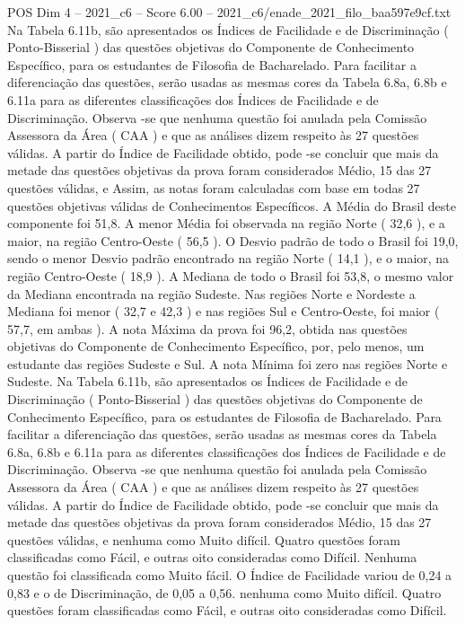 \begin{textsample}{POS Dim 4 – 2021\_c6 – Score 6.00 – 2021\_c6/enade\_2021\_filo\_baa597e9cf.txt}
Na Tabela 6.11b, são apresentados os Índices de Facilidade e de Discriminação ( Ponto-Bisserial ) das questões objetivas do Componente de Conhecimento Específico, para os estudantes de Filosofia de Bacharelado.
Para facilitar a diferenciação das questões, serão usadas as mesmas cores da Tabela 6.8a, 6.8b e 6.11a para as diferentes classificações dos Índices de Facilidade e de Discriminação.
Observa -se que nenhuma questão foi anulada pela Comissão Assessora da Área ( CAA ) e que as análises dizem respeito às 27 questões válidas.
A partir do Índice de Facilidade obtido, pode -se concluir que mais da metade das questões objetivas da prova foram considerados Médio, 15 das 27 questões válidas, e Assim, as notas foram calculadas com base em todas 27 questões objetivas válidas de Conhecimentos Específicos.
A Média do Brasil deste componente foi 51,8.
A menor Média foi observada na região Norte ( 32,6 ), e a maior, na região Centro-Oeste ( 56,5 ).
O Desvio padrão de todo o Brasil foi 19,0, sendo o menor Desvio padrão encontrado na região Norte ( 14,1 ), e o maior, na região Centro-Oeste ( 18,9 ).
A Mediana de todo o Brasil foi 53,8, o mesmo valor da Mediana encontrada na região Sudeste.
Nas regiões Norte e Nordeste a Mediana foi menor ( 32,7 e 42,3 ) e nas regiões Sul e Centro-Oeste, foi maior ( 57,7, em ambas ).
A nota Máxima da prova foi 96,2, obtida nas questões objetivas do Componente de Conhecimento Específico, por, pelo menos, um estudante das regiões Sudeste e Sul.
A nota Mínima foi zero nas regiões Norte e Sudeste.
Na Tabela 6.11b, são apresentados os Índices de Facilidade e de Discriminação ( Ponto-Bisserial ) das questões objetivas do Componente de Conhecimento Específico, para os estudantes de Filosofia de Bacharelado.
Para facilitar a diferenciação das questões, serão usadas as mesmas cores da Tabela 6.8a, 6.8b e 6.11a para as diferentes classificações dos Índices de Facilidade e de Discriminação.
Observa -se que nenhuma questão foi anulada pela Comissão Assessora da Área ( CAA ) e que as análises dizem respeito às 27 questões válidas.
A partir do Índice de Facilidade obtido, pode -se concluir que mais da metade das questões objetivas da prova foram considerados Médio, 15 das 27 questões válidas, e nenhuma como Muito difícil.
Quatro questões foram classificadas como Fácil, e outras oito consideradas como Difícil.
Nenhuma questão foi classificada como Muito fácil.
O Índice de Facilidade variou de 0,24 a 0,83 e o de Discriminação, de 0,05 a 0,56. nenhuma como Muito difícil.
Quatro questões foram classificadas como Fácil, e outras oito consideradas como Difícil.

\end{textsample}

